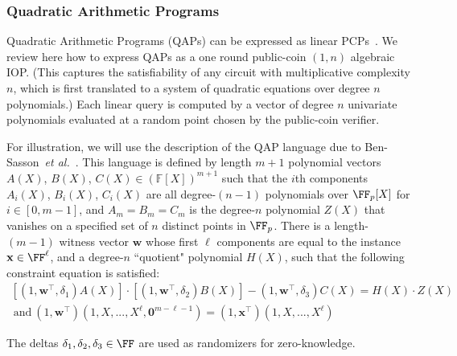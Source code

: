 \subsubsection{Quadratic Arithmetic Programs} 

Quadratic Arithmetic Programs (QAPs) can be expressed as linear PCPs~\cite{TCC:BCIOP13,C:BCGTV13}. We review here how to express QAPs as a one round public-coin $(1, n)$ algebraic IOP. (This captures the satisfiability of any circuit with multiplicative complexity $n$, which is first translated to a system of quadratic equations over degree $n$ polynomials.) Each linear query is computed by a vector of degree $n$ univariate polynomials evaluated at a random point chosen by the public-coin verifier.

For illustration, we will use the description of the QAP language due to Ben-Sasson~\emph{et al.}~\cite[\S E.1]{C:BCGTV13}.
This language is defined by length $m+1$ polynomial vectors $A(X)$, $B(X)$, $C(X) \in (\mathbb{F}[X])^{m+1}$ such that the $i$th components $A_i(X)$, $B_i(X)$, $C_i(X)$ are all degree-$(n-1)$ polynomials over $\FF_p[X]$ for $i \in [0,m-1]$, and $A_m = B_m = C_m$ is the degree-$n$ polynomial $Z(X)$ that vanishes on a specified set of $n$ distinct points in $\FF_p$.
There is a length-$(m-1)$ witness vector $\mathbf{w}$ whose first $\ell$ components are equal to the instance $\mathbf{x} \in \FF^\ell$, and a degree-$n$ ``quotient" polynomial $H(X)$, such that the following constraint equation is satisfied: 
\begin{equation} \label{eqn:R1CS} 
\begin{split}
[(1, \mathbf{w}^\top, \delta_1) A(X)] \cdot [(1, \mathbf{w}^\top, \delta_2) B(X)] 
- (1, \mathbf{w}^\top, \delta_3) C(X) = H(X) \cdot Z(X) \\ 
\ \mathrm{and} \ (1,\mathbf{w}^\top) (1,X,...,X^{\ell}, \mathbf{0}^{m- \ell -1}) = (1,\mathbf{x}^\top) (1, X,...,X^{\ell})
\end{split} 
\end{equation} 

The deltas $\delta_1, \delta_2, \delta_3 \in \FF$ are used as randomizers for zero-knowledge. 

